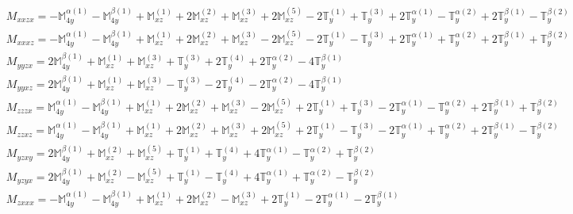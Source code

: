\documentclass[fleqn,8pt,landscape]{jsarticle}
\begin{document}
\begin{align*}
& M_{xxzx} = - \mathbb{M}_{4y}^{\alpha(1)} - \mathbb{M}_{4y}^{\beta(1)} + \mathbb{M}_{xz}^{(1)} + 2 \mathbb{M}_{xz}^{(2)} + \mathbb{M}_{xz}^{(3)} + 2 \mathbb{M}_{xz}^{(5)} - 2 \mathbb{T}_{y}^{(1)} + \mathbb{T}_{y}^{(3)} + 2 \mathbb{T}_{y}^{\alpha(1)} - \mathbb{T}_{y}^{\alpha(2)} + 2 \mathbb{T}_{y}^{\beta(1)} - \mathbb{T}_{y}^{\beta(2)} \\
& M_{xxxz} = - \mathbb{M}_{4y}^{\alpha(1)} - \mathbb{M}_{4y}^{\beta(1)} + \mathbb{M}_{xz}^{(1)} + 2 \mathbb{M}_{xz}^{(2)} + \mathbb{M}_{xz}^{(3)} - 2 \mathbb{M}_{xz}^{(5)} - 2 \mathbb{T}_{y}^{(1)} - \mathbb{T}_{y}^{(3)} + 2 \mathbb{T}_{y}^{\alpha(1)} + \mathbb{T}_{y}^{\alpha(2)} + 2 \mathbb{T}_{y}^{\beta(1)} + \mathbb{T}_{y}^{\beta(2)} \\
& M_{yyzx} = 2 \mathbb{M}_{4y}^{\beta(1)} + \mathbb{M}_{xz}^{(1)} + \mathbb{M}_{xz}^{(3)} + \mathbb{T}_{y}^{(3)} + 2 \mathbb{T}_{y}^{(4)} + 2 \mathbb{T}_{y}^{\alpha(2)} - 4 \mathbb{T}_{y}^{\beta(1)} \\
& M_{yyxz} = 2 \mathbb{M}_{4y}^{\beta(1)} + \mathbb{M}_{xz}^{(1)} + \mathbb{M}_{xz}^{(3)} - \mathbb{T}_{y}^{(3)} - 2 \mathbb{T}_{y}^{(4)} - 2 \mathbb{T}_{y}^{\alpha(2)} - 4 \mathbb{T}_{y}^{\beta(1)} \\
& M_{zzzx} = \mathbb{M}_{4y}^{\alpha(1)} - \mathbb{M}_{4y}^{\beta(1)} + \mathbb{M}_{xz}^{(1)} + 2 \mathbb{M}_{xz}^{(2)} + \mathbb{M}_{xz}^{(3)} - 2 \mathbb{M}_{xz}^{(5)} + 2 \mathbb{T}_{y}^{(1)} + \mathbb{T}_{y}^{(3)} - 2 \mathbb{T}_{y}^{\alpha(1)} - \mathbb{T}_{y}^{\alpha(2)} + 2 \mathbb{T}_{y}^{\beta(1)} + \mathbb{T}_{y}^{\beta(2)} \\
& M_{zzxz} = \mathbb{M}_{4y}^{\alpha(1)} - \mathbb{M}_{4y}^{\beta(1)} + \mathbb{M}_{xz}^{(1)} + 2 \mathbb{M}_{xz}^{(2)} + \mathbb{M}_{xz}^{(3)} + 2 \mathbb{M}_{xz}^{(5)} + 2 \mathbb{T}_{y}^{(1)} - \mathbb{T}_{y}^{(3)} - 2 \mathbb{T}_{y}^{\alpha(1)} + \mathbb{T}_{y}^{\alpha(2)} + 2 \mathbb{T}_{y}^{\beta(1)} - \mathbb{T}_{y}^{\beta(2)} \\
& M_{yzxy} = 2 \mathbb{M}_{4y}^{\beta(1)} + \mathbb{M}_{xz}^{(2)} + \mathbb{M}_{xz}^{(5)} + \mathbb{T}_{y}^{(1)} + \mathbb{T}_{y}^{(4)} + 4 \mathbb{T}_{y}^{\alpha(1)} - \mathbb{T}_{y}^{\alpha(2)} + \mathbb{T}_{y}^{\beta(2)} \\
& M_{yzyx} = 2 \mathbb{M}_{4y}^{\beta(1)} + \mathbb{M}_{xz}^{(2)} - \mathbb{M}_{xz}^{(5)} + \mathbb{T}_{y}^{(1)} - \mathbb{T}_{y}^{(4)} + 4 \mathbb{T}_{y}^{\alpha(1)} + \mathbb{T}_{y}^{\alpha(2)} - \mathbb{T}_{y}^{\beta(2)} \\
& M_{zxxx} = - \mathbb{M}_{4y}^{\alpha(1)} - \mathbb{M}_{4y}^{\beta(1)} + \mathbb{M}_{xz}^{(1)} + 2 \mathbb{M}_{xz}^{(2)} - \mathbb{M}_{xz}^{(3)} + 2 \mathbb{T}_{y}^{(1)} - 2 \mathbb{T}_{y}^{\alpha(1)} - 2 \mathbb{T}_{y}^{\beta(1)} \\

\end{align*}
\end{document}
